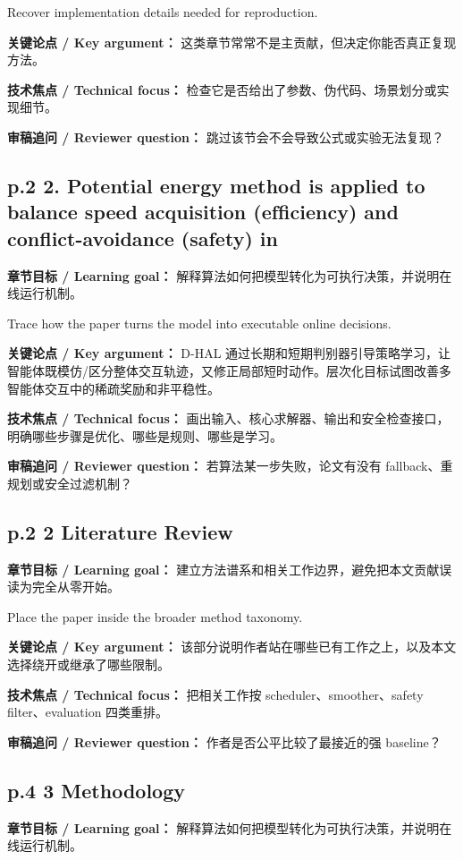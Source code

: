 \documentclass[UTF8,a4paper,11pt,fontset=fandol]{ctexart}
\begin{document}
Recover implementation details needed for reproduction.

\textbf{关键论点 / Key argument：} 这类章节常常不是主贡献，但决定你能否真正复现方法。

\textbf{技术焦点 / Technical focus：} 检查它是否给出了参数、伪代码、场景划分或实现细节。

\textbf{审稿追问 / Reviewer question：} 跳过该节会不会导致公式或实验无法复现？

\subsection*{p.2 2. Potential energy method is applied to balance speed acquisition (efﬁciency) and conﬂict-avoidance (safety) in}
\textbf{章节目标 / Learning goal：} 解释算法如何把模型转化为可执行决策，并说明在线运行机制。

Trace how the paper turns the model into executable online decisions.

\textbf{关键论点 / Key argument：} D-HAL 通过长期和短期判别器引导策略学习，让智能体既模仿/区分整体交互轨迹，又修正局部短时动作。层次化目标试图改善多智能体交互中的稀疏奖励和非平稳性。

\textbf{技术焦点 / Technical focus：} 画出输入、核心求解器、输出和安全检查接口，明确哪些步骤是优化、哪些是规则、哪些是学习。

\textbf{审稿追问 / Reviewer question：} 若算法某一步失败，论文有没有 fallback、重规划或安全过滤机制？

\subsection*{p.2 2 Literature Review}
\textbf{章节目标 / Learning goal：} 建立方法谱系和相关工作边界，避免把本文贡献误读为完全从零开始。

Place the paper inside the broader method taxonomy.

\textbf{关键论点 / Key argument：} 该部分说明作者站在哪些已有工作之上，以及本文选择绕开或继承了哪些限制。

\textbf{技术焦点 / Technical focus：} 把相关工作按 scheduler、smoother、safety filter、evaluation 四类重排。

\textbf{审稿追问 / Reviewer question：} 作者是否公平比较了最接近的强 baseline？

\subsection*{p.4 3 Methodology}
\textbf{章节目标 / Learning goal：} 解释算法如何把模型转化为可执行决策，并说明在线运行机制。
\end{document}
